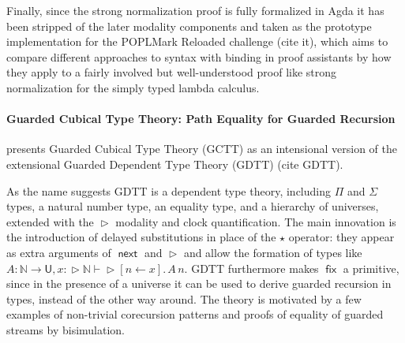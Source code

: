 \documentclass{book}
\DeclareMathOperator{\fix}{\mathsf{fix}}
\DeclareMathOperator{\Later}{\vartriangleright}
\DeclareMathOperator{\next}{\ensuremath{\mathsf{next}}}
\newcommand{\sd}{.\,}
\begin{document}
  Finally, since the strong normalization proof is fully formalized in
  Agda it has been stripped of the later modality components and taken
  as the prototype implementation for the POPLMark Reloaded challenge (cite it),
  which aims to compare different approaches to syntax with binding in
  proof assistants by how they apply to a fairly involved but
  well-understood proof like strong normalization for the simply typed
  lambda calculus.



  \paragraph{Guarded Cubical Type Theory: Path Equality for Guarded Recursion}
  presents Guarded Cubical Type Theory (GCTT) as an intensional
  version of the extensional Guarded Dependent Type Theory (GDTT)
  (cite GDTT).

  As the name suggests GDTT is a dependent type theory, including
  $\Pi$ and $\Sigma$ types, a natural number type, an equality type, and a hierarchy of
  universes, extended with the $\Later$ modality and clock
  quantification. The main innovation is the introduction of delayed
  substitutions in place of the $\star$ operator: they appear as extra
  arguments of $\next$ and $\Later$ and allow the formation of types
  like $ A : \mathbb{N} \to \mathsf{U}, x : \Later \mathbb{N} \vdash
  \Later [n \leftarrow x]\sd A\,n$.
  GDTT furthermore makes $\fix$ a primitive, since in the presence of
  a universe it can be used to derive guarded recursion in types,
  instead of the other way around. The theory is motivated by a few
  examples of non-trivial corecursion patterns and proofs of equality
  of guarded streams by bisimulation.
\end{document}
